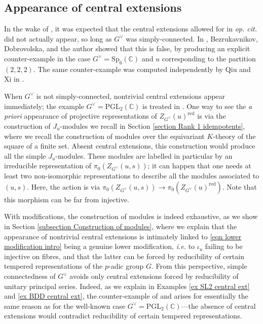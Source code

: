 \documentclass[10pt]{article}
\newcommand{\C}{\mathbb{C}}
\newcommand{\PGL}{\mathrm{PGL}}
\newcommand{\Sp}{\mathrm{Sp}}
\theoremstyle{definition}
\theoremstyle{remark}
\newcommand{\Gd}{G^\vee}
\newcommand{\Zur}{Z_{G^\vee}(u)^{\mathrm{red}}}
\begin{document}
%
\subsection{Appearance of central extensions}
In the wake of \cite{BO}, it was expected that the central extensions allowed for in \textit{op. cit.} did not actually appear, so long as $G^\vee$ was simply-connected. In \cite{BDD}, Bezrukavnikov, Dobrovolska, 
and the author showed that this is false, by producing an explicit 
counter-example in the case $\Gd=\Sp_6(\C)$ and $u$ corresponding to the 
partition $(2,2,2)$. The same counter-example was computed independently by 
Qiu and Xi in \cite{QX}. 

When $\Gd$ is not simply-connected, nontrivial central extensions appear immediately; the example 
$G^\vee=\PGL_2(\C)$ is treated in \cite[Section 8.3]{XiAMemoir}. One way to see the \textit{a priori} appearance of projective representations of $\Zur$ is via the construction of $J_u$-modules we recall in Section \ref{section Rank 1 idempotents}, where we recall the construction of modules over the equivariant $K$-theory of the square of a finite set. Absent central extensions, this construction would produce all the simple $J_u$-modules. These modules are labelled in particular by an irreducible representation of $\pi_0(Z_{G^\vee}(u,s))$; it can happen that one needs at least two non-isomorphic representations to describe all the modules associated to $(u,s)$. Here, the action is via $\pi_0(Z_{G^\vee}(u,s))\to\pi_0(\Zur)$. Note that this morphism can be far from injective.

With modifications, the construction of modules is indeed exhaustive, as we show in Section \ref{subsection Construction of modules}, where we explain that the appearance of nontrivial central extensions is
intimately linked to \eqref{eqn lower modification intro} being a genuine lower modification, \textit{i.e.}
to $\iota_u$ failing to be injective on fibres, and that the latter can be forced by reducibility of
certain tempered representations of the $p$-adic group $G$. From this perspective, simple connectedness of 
$G^\vee$ avoids only central extensions 
forced by reducibility of unitary principal series. Indeed, as we explain in Examples 
\ref{ex SL2 central ext} and \ref{ex BDD central ext}, the counter-example of \cite{BDD} and \cite{QX} 
arises for essentially the same reason as for the well-known case $\Gd=\PGL_2(\C)$---the absence of central 
extensions would contradict reducibility of certain tempered representations.
%
\end{document}
